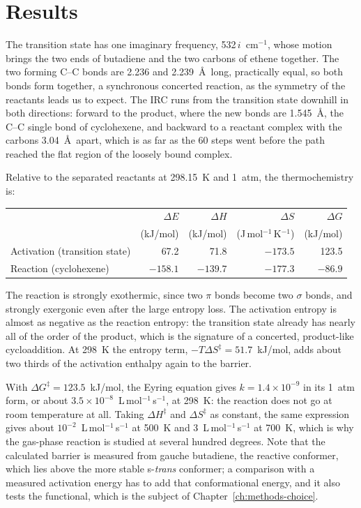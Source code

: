 \section{Results}
The transition state has one imaginary frequency, 532\,$i$~cm$^{-1}$, whose motion brings the two ends of butadiene and the two carbons of ethene together. The two forming C--C bonds are 2.236 and 2.239~\AA\ long, practically equal, so both bonds form together, a synchronous concerted reaction, as the symmetry of the reactants leads us to expect. The IRC runs from the transition state downhill in both directions: forward to the product, where the new bonds are 1.545~\AA, the C--C single bond of cyclohexene, and backward to a reactant complex with the carbons 3.04~\AA\ apart, which is as far as the 60 steps went before the path reached the flat region of the loosely bound complex.

Relative to the separated reactants at 298.15~K and 1~atm, the thermochemistry is:
\begin{center}
\begin{tabular}{lrrrr}
	\toprule
	 & $\Delta E$ & $\Delta H$ & $\Delta S$ & $\Delta G$ \\
	 & (kJ/mol) & (kJ/mol) & (J\,mol$^{-1}$\,K$^{-1}$) & (kJ/mol) \\
	\midrule
	Activation (transition state) & 67.2 & 71.8 & $-173.5$ & 123.5 \\
	Reaction (cyclohexene) & $-158.1$ & $-139.7$ & $-177.3$ & $-86.9$ \\
	\bottomrule
\end{tabular}
\end{center}
The reaction is strongly exothermic, since two $\pi$ bonds become two $\sigma$ bonds, and strongly exergonic even after the large entropy loss. The activation entropy is almost as negative as the reaction entropy: the transition state already has nearly all of the order of the product, which is the signature of a concerted, product-like cycloaddition. At 298~K the entropy term, $-T\Delta S^\ddagger = 51.7$~kJ/mol, adds about two thirds of the activation enthalpy again to the barrier.

With $\Delta G^\ddagger = 123.5$~kJ/mol, the Eyring equation gives $k = 1.4 \times 10^{-9}$ in its 1~atm form, or about $3.5 \times 10^{-8}$~L\,mol$^{-1}$\,s$^{-1}$, at 298~K: the reaction does not go at room temperature at all. Taking $\Delta H^\ddagger$ and $\Delta S^\ddagger$ as constant, the same expression gives about $10^{-2}$~L\,mol$^{-1}$\,s$^{-1}$ at 500~K and 3~L\,mol$^{-1}$\,s$^{-1}$ at 700~K, which is why the gas-phase reaction is studied at several hundred degrees. Note that the calculated barrier is measured from gauche butadiene, the reactive conformer, which lies above the more stable s-\emph{trans} conformer; a comparison with a measured activation energy has to add that conformational energy, and it also tests the functional, which is the subject of Chapter~\ref{ch:methods-choice}.

